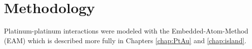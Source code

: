 %
%

\section{Methodology}
Platinum-platinum interactions were modeled with the Embedded-Atom-Method (EAM)
which is described more fully in Chapters \ref{chap:PtAu} and
\ref{chap:island}.\citep{Foiles:1986ky}

